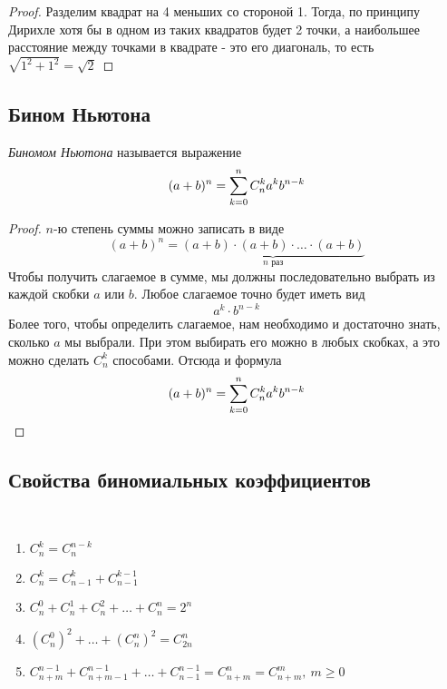 \begin{proof}
	Разделим квадрат на 4 меньших со стороной 1. Тогда, по принципу Дирихле хотя бы в одном из таких квадратов будет 2 точки, а наибольшее расстояние между точками в квадрате - это его диагональ, то есть $\sqrt{1^2 + 1^2} = \sqrt{2}$
\end{proof}

\subsection{Бином Ньютона}

\begin{definition}
	\textit{Биномом Ньютона} называется выражение
	\[
		(a + b)^n = \sum\limits_{k = 0}^n C_n^k a^k b^{n - k}
	\]
\end{definition}

\begin{proof}
	$n$-ю степень суммы можно записать в виде
	\[
		(a + b)^n = \underbrace{(a + b) \cdot (a + b) \cdot \ldots \cdot (a + b)}_{n \text{ раз}}
	\]
	Чтобы получить слагаемое в сумме, мы должны последовательно выбрать из каждой скобки $a$ или $b$. Любое слагаемое точно будет иметь вид
	\[
		a^k \cdot b^{n - k}
	\]
	Более того, чтобы определить слагаемое, нам необходимо и достаточно знать, сколько $a$ мы выбрали. При этом выбирать его можно в любых скобках, а это можно сделать $C_n^k$ способами. Отсюда и формула
	\[
		(a + b)^n = \sum\limits_{k = 0}^n C_n^k a^k b^{n - k}
	\]
\end{proof}

\subsection{Свойства биномиальных коэффициентов}

\begin{theorem}~
	\begin{enumerate}
		\item $C_n^k = C_n^{n - k}$
		\item $C_n^k = C_{n - 1}^k + C_{n - 1}^{k - 1}$
		\item $C_n^0 + C_n^1 + C_n^2 + \ldots + C_n^n = 2^n$
		\item $\left(C_n^0\right)^2 + \ldots + \left(C_n^n\right)^2 = C_{2n}^n$
		\item $C_{n + m}^{n - 1} + C_{n + m - 1}^{n - 1} + \ldots + C_{n - 1}^{n - 1} = C_{n + m}^n = C_{n + m}^m,\ m \ge 0$
	\end{enumerate}
\end{theorem}

